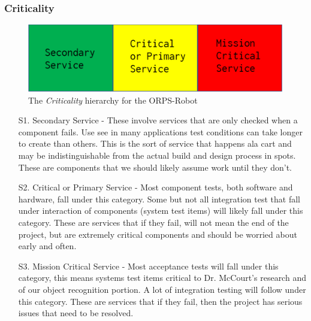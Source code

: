 \documentclass[english,12pt]{article}
\begin{document}
\subsubsection{Criticality}
\begin{figure}[h!]
    \centerline{\includegraphics[width = \textwidth]{crit.jpg}}
    \caption{The \textit{Criticality} hierarchy for the ORPS-Robot}
\end{figure}
\begin{itemize}
    \item[S1.] Secondary Service - These involve services that are only checked when a component 
    fails. Use see in many applications test conditions can take longer to create than others. 
    This is the sort of service that happens ala cart and may be indistinguishable from the actual 
    build and design process in spots. These are components that we should likely assume work until 
    they don't.
    \item[S2.] Critical or Primary Service - Most component tests, both software and hardware, 
    fall under this category. Some but not all integration test that fall under interaction of 
    components (system test items) will likely fall under this category. These are services that 
    if they fail, will not mean the end of the project, but are extremely critical components 
    and should be worried about early and often.
    \item[S3.] Mission Critical Service - Most acceptance tests will fall under this category, this 
    means systems test items critical to Dr. McCourt’s research and of our object recognition 
    portion. A lot of integration testing will follow under this category. These are services 
    that if they fail, then the project has serious issues that need to be resolved.
\end{itemize}
\end{document}
